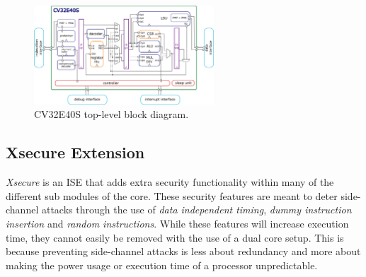 
\begin{figure}[h!]
    \centering
    \includegraphics[width=0.6\textwidth]{docs/images/CV32E40S_Block_Diagram.png}
    \caption{CV32E40S top-level block diagram\cite{cv32e40s_manual}.}
    \label{fig:cv32e40s_block}
\end{figure}

\subsection{Xsecure Extension}
\label{sec:xsecure}

\textit{Xsecure} is an ISE that adds extra security functionality within many of the different sub modules of the core. These security features are meant to deter side-channel attacks through the use of \textit{data independent timing}, \textit{dummy instruction insertion} and \textit{random instructions}\cite{cv32e40s_manual}. While these features will increase execution time, they cannot easily be removed with the use of a dual core setup. This is because preventing side-channel attacks is less about redundancy and more about making the power usage or execution time of a processor unpredictable. 

